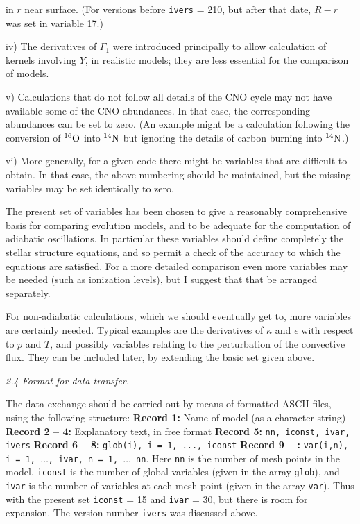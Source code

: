 in $r$ near surface. (For versions before {\tt ivers} = 210,
but after that date, $R - r$ was set in variable 17.)
\item{iv)}
The derivatives of $\Gamma_1$ were introduced principally to allow
calculation of kernels involving $Y$, in realistic models;
they are less essential for the comparison of models.
\item{v)}
Calculations that do not follow all details of the CNO cycle
may not have available some of the CNO abundances.
In that case, the corresponding abundances can be set to zero.
(An example might be a calculation following the conversion of
${}^{16}{\rm O}$ into ${}^{14}{\rm N}$ but ignoring the
details of carbon burning into ${}^{14}{\rm N}$.)
\item{vi)}
More generally, for a given code there might be variables that are
difficult to obtain. 
In that case, the above numbering should be maintained, but the
missing variables may be set identically to zero.

\medskip\noindent
The present set of variables has been chosen to give a reasonably
comprehensive basis for comparing evolution models, and to be
adequate for the computation of adiabatic oscillations.
In particular these variables should define completely
the stellar structure equations, and so permit a check of the
accuracy to which the equations are satisfied.
For a more detailed comparison even more variables may be needed
(such as ionization levels), but I suggest that that be arranged
separately. 

For non-adiabatic calculations, which we should eventually
get to, more variables are certainly needed.
Typical examples are the derivatives of $\kappa$ and $\epsilon$
with respect to $p$ and $T$, and possibly variables relating
to the perturbation of the convective flux.
They can be included later, by extending the basic set
given above.

\subsect
{\it 2.4 Format for data transfer.}

The data exchange should be carried out by means of formatted
ASCII files, using the following structure:
\medskip
{\obeylines
{\bf Record 1:} %
Name of model (as a character string)
{\bf Record 2 -- 4:} %
Explanatory text, in free format
{\bf Record 5:} %
{\tt nn, iconst, ivar, ivers}
{\bf Record 6 -- 8:} %
{\tt glob(i), i = 1, ..., iconst}
{\bf Record 9 --  :} %
{\tt var(i,n), i = 1, $\ldots$, ivar, n = 1, $\ldots$ nn}.
}
\medskip\noindent
Here {\tt nn} is the number of mesh points in the model,
{\tt iconst} is the number of global variables (given in the array
{\tt glob}), and {\tt ivar} is the number of variables at each mesh point
(given in the array {\tt var}).
Thus with the present set {\tt iconst} = 15 and {\tt ivar} = 30, but there is
room for expansion.
The version number {\tt ivers} was discussed above.

